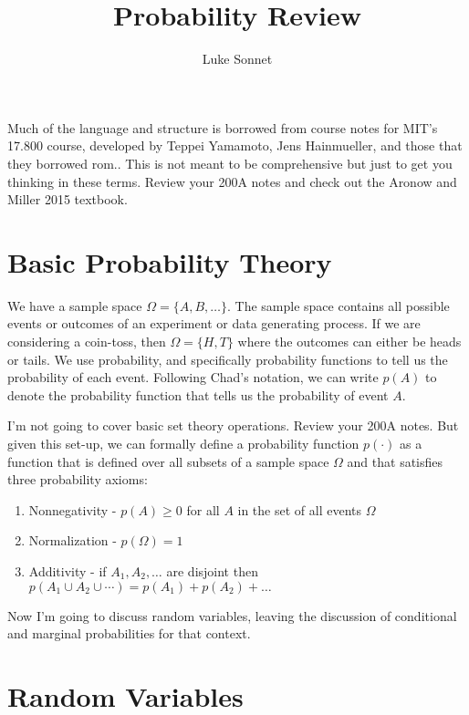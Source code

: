 \documentclass{article} %
\author{Luke Sonnet}
\title{Probability Review}
\newcommand*\red{\color{red}}  %
\begin{document}
\singlespacing
\maketitle %
\onehalfspacing

Much of the language and structure is borrowed from course notes for MIT's 17.800 course, developed by Teppei Yamamoto, Jens Hainmueller, and those that they borrowed rom.. This is not meant to be comprehensive but just to get you thinking in these terms. Review your 200A notes and check out the Aronow and Miller 2015 textbook.

\section{Basic Probability Theory}

We have a {\red sample space} $\Omega = \{A, B, \dots\}$. The sample space contains all possible events or outcomes of an experiment or data generating process. If we are considering a coin-toss, then $\Omega = \{H, T\}$ where the outcomes can either be heads or tails. We use probability, and specifically {\red probability functions} to tell us the probability of each event. Following Chad's notation, we can write $p(A)$ to denote the probability function that tells us the probability of event $A$.

I'm not going to cover basic set theory operations. Review your 200A notes. But given this set-up, we can formally define a probability function $p(\cdot)$ as a function that is defined over all subsets of a sample space $\Omega$ and that satisfies three probability axioms:

\begin{enumerate}
	\item {\red Nonnegativity} - $p(A) \geq 0$ for all $A$ in the set of all events $\Omega$
	\item {\red Normalization} - $p(\Omega) = 1$
	\item {\red Additivity} - if $A_1, A_2, \dots$ are disjoint then $p(A_1 \cup A_2 \cup \cdots ) = p(A_1) + p(A_2) + \dots$
\end{enumerate}

Now I'm going to discuss random variables, leaving the discussion of conditional and marginal probabilities for that context.

\section{Random Variables}
\end{document}
